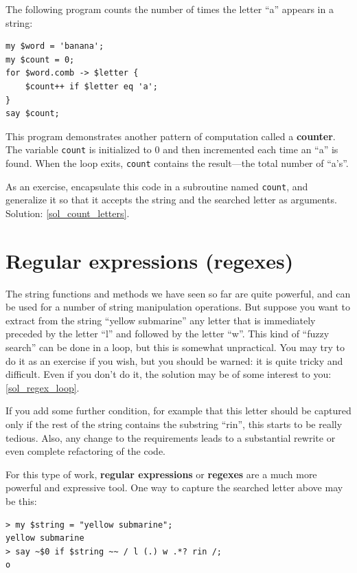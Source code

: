 The following program counts the number of times the 
letter ``a'' appears in a string:

\begin{verbatim}
my $word = 'banana';
my $count = 0;
for $word.comb -> $letter {
    $count++ if $letter eq 'a';
}
say $count;
\end{verbatim}
%

This program demonstrates another pattern of computation called a {\bf
counter}.  The variable {\tt count} is initialized to 0 and then
incremented each time an ``a'' is found.
When the loop exits, {\tt count}
contains the result---the total number of ``a's''.

As an exercise, encapsulate this code in a subroutine named 
{\tt count}, and generalize it so that it accepts the string
and the searched letter as arguments. Solution: \ref{sol_count_letters}.
\label{count_letters}

\section{Regular expressions (regexes)}
\label{regex}

The string functions and methods we have seen so far are 
quite powerful, and can be used for a number of string 
manipulation operations. But suppose you want to extract 
from the string ``yellow submarine'' any letter that is 
immediately preceded by the letter ``l'' and followed by 
the letter ``w''. This kind of ``fuzzy search'' 
can be done in a loop, but this is 
somewhat unpractical. You may try to do it as an exercise if 
you wish, but you should be warned: it is quite tricky and 
difficult. Even if you don't do it, the solution may be of some 
interest to you: \ref{sol_regex_loop}. 
\label{regex_loop}


If you add some further condition, 
for example that this letter should be captured only if 
the rest of the string contains the substring ``rin'', 
this starts to be really tedious. Also, any change to the 
requirements leads to a substantial rewrite or even 
complete refactoring of the code.

For this type of work, {\bf regular expressions} or 
{\bf regexes}  are a much more powerful and expressive tool. 
One way to capture the searched letter above may be this:

\begin{verbatim}
> my $string = "yellow submarine";
yellow submarine
> say ~$0 if $string ~~ / l (.) w .*? rin /;
o
\end{verbatim}

